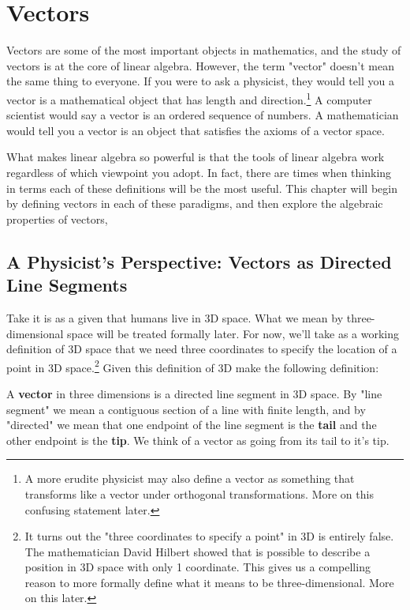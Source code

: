 \chapter{Vectors}

Vectors are some of the most important objects in mathematics, and the study of vectors is at the core of linear algebra. However, the term "vector" doesn't mean the same thing to everyone. If you were to ask a physicist, they would tell you a vector is a mathematical object that has length and direction.\footnote{A more erudite physicist may also define a vector as something that transforms like a vector under orthogonal transformations. More on this confusing statement later.} A computer scientist would say a vector is an ordered sequence of numbers. A mathematician would tell you a vector is an object that satisfies the axioms of a vector space.

What makes linear algebra so powerful is that the tools of linear algebra work regardless of which viewpoint you adopt. In fact, there are times when thinking in terms each of these definitions will be the most useful. This chapter will begin by defining vectors in each of these paradigms, and then explore the algebraic properties of vectors,

\section{A Physicist's Perspective: Vectors as Directed Line Segments}

Take it is as a given that humans live in 3D space. What we mean by three-dimensional space will be treated formally later. For now, we'll take as a working definition of 3D space that we need three coordinates to specify the location of a point in 3D space.\footnote{It turns out the "three coordinates to specify a point" in 3D is entirely false. The mathematician David Hilbert showed that is possible to describe a position in 3D space with only 1 coordinate. This gives us a compelling reason to more formally define what it means to be three-dimensional. More on this later.} Given this definition of 3D make the following definition:

\begin{definition}
	A \textbf{vector} in three dimensions is a directed line segment in 3D space. By "line segment" we mean a contiguous section of a line with finite length, and by "directed" we mean that one endpoint of the line segment is the \textbf{tail} and the other endpoint is the \textbf{tip}. We think of a vector as going from its tail to it's tip.
\end{definition}

